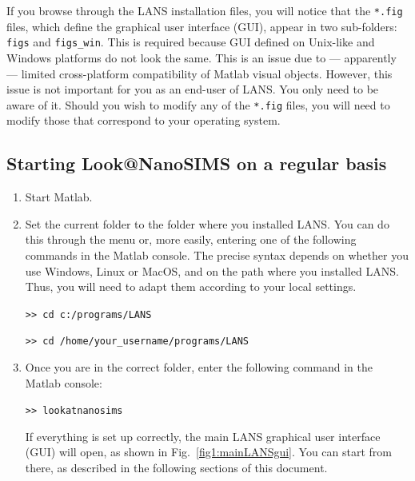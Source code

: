 \documentclass[a4paper, 11pt]{article}
\newcommand{\ttt}[1]{\texttt{#1}}
\newcommand\mnote{\marginnote{\fbox{\textbf{\bf Note}}}}
\begin{document}
\mnote
If you browse through the LANS installation files, you will notice that the \ttt{*.fig} files, which define the graphical user interface (GUI), appear in two sub-folders: \ttt{figs} and \ttt{figs\_win}. This is required because GUI defined on Unix-like and Windows platforms do not look the same. This is an issue due to --- apparently --- limited cross-platform compatibility of Matlab visual objects. However, this issue is not important for you as an end-user of LANS. You only need to be aware of it. Should you wish to modify any of the \ttt{*.fig} files, you will need to modify those that correspond to your operating system.


\subsection{Starting Look@NanoSIMS on a regular basis}

\begin{enumerate}

\item Start Matlab.

\item Set the current folder to the folder where you installed LANS. You can do this through the menu or, more easily, entering one of the following commands in the Matlab console. The precise syntax depends on whether you use Windows, Linux or MacOS, and on the path where you installed LANS. Thus, you will need to adapt them according to your local settings.

\ttt{>> cd c:/programs/LANS}

\ttt{>> cd /home/your\_username/programs/LANS}

\item Once you are in the correct folder, enter the following command in the Matlab console:

\ttt{>> lookatnanosims}

If everything is set up correctly, the main LANS graphical user interface (GUI) will open, as shown in Fig.~\ref{fig1:mainLANSgui}. You can start from there, as described in the following sections of this document. 

\end{enumerate}
\end{document}
